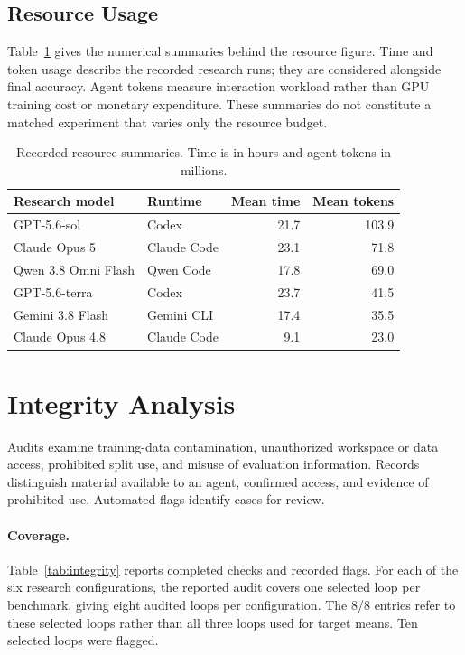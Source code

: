 \subsection{Resource Usage}
Table~\ref{tab:appendix-resource} gives the numerical summaries behind the resource figure. Time and token usage describe the recorded research runs; they are considered alongside final accuracy. Agent tokens measure interaction workload rather than GPU training cost or monetary expenditure. These summaries do not constitute a matched experiment that varies only the resource budget.

\begin{table}[!htbp]
\miletablestyle
\caption{Recorded resource summaries. Time is in hours and agent tokens in millions.}
\label{tab:appendix-resource}
\begin{tabular*}{\linewidth}{@{\extracolsep{\fill}}llrr@{}}
\toprule
Research model & Runtime & Mean time & Mean tokens \\
\midrule
GPT-5.6-sol & Codex & 21.7 & 103.9 \\
Claude Opus 5 & Claude Code & 23.1 & 71.8 \\
Qwen 3.8 Omni Flash & Qwen Code & 17.8 & 69.0 \\
GPT-5.6-terra & Codex & 23.7 & 41.5 \\
Gemini 3.8 Flash & Gemini CLI & 17.4 & 35.5 \\
Claude Opus 4.8 & Claude Code & 9.1 & 23.0 \\
\bottomrule
\end{tabular*}
\end{table}

\section{Integrity Analysis}
\label{app:audit-coverage}
Audits examine training-data contamination, unauthorized workspace or data access, prohibited split use, and misuse of evaluation information. Records distinguish material available to an agent, confirmed access, and evidence of prohibited use. Automated flags identify cases for review.

\paragraph{Coverage.}
Table~\ref{tab:integrity} reports completed checks and recorded flags. For each of the six research configurations, the reported audit covers one selected loop per benchmark, giving eight audited loops per configuration. The 8/8 entries refer to these selected loops rather than all three loops used for target means. Ten selected loops were flagged.

